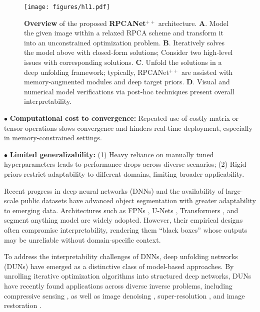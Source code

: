 \documentclass[10pt,journal,compsoc]{IEEEtran}
\begin{document}
\begin{figure*}[!t]
\setlength{\abovecaptionskip}{0.1cm}
\setlength{\belowcaptionskip}{0cm}
\centering
	\texttt{[image: figures/hl1.pdf]}
   \caption{\textbf{Overview} of the proposed \textbf{RPCANet$^{++}$} architecture. \textbf{A}. Model the given image within a relaxed RPCA scheme and transform it into an unconstrained optimization problem. \textbf{B}. Iteratively solves the model above with closed-form solutions; Consider two high-level issues with corresponding solutions. \textbf{C}. Unfold the solutions in a deep unfolding framework; typically, RPCANet$^{++}$ are assisted with memory-augmented modules and deep target priors. \textbf{D}. Visual and numerical model verifications via post-hoc techniques present overall interpretability.}
\label{fig:short}
\vspace{-0.3cm}
\end{figure*}



$\bullet$ \textbf{Computational cost to convergence:} Repeated use of costly matrix or tensor operations slows convergence and hinders real-time deployment, especially in memory-constrained settings.

$\bullet$ \textbf{Limited generalizability:} 
(1) Heavy reliance on manually tuned hyperparameters leads to performance drops across diverse scenarios;  
(2) Rigid priors restrict adaptability to different domains, limiting broader applicability.


Recent progress in deep neural networks (DNNs) and the availability of large-scale public datasets have advanced object segmentation with greater adaptability to emerging data. Architectures such as FPNs \cite{lin-2017-fpn}, U-Nets \cite{ronneberger-2015-unet}, Transformers \cite{vaswani-2017-transformer}, and segment anything model \cite{kirillov2023sam} are widely adopted. However, their empirical designs often compromise interpretability, rendering them “black boxes” whose outputs may be unreliable without domain-specific context.

To address the interpretability challenges of DNNs, deep unfolding networks (DUNs) have emerged as a distinctive class of model-based approaches. By unrolling iterative optimization algorithms into structured deep networks, DUNs have recently found applications across diverse inverse problems, including compressive sensing \cite{sun-2016-admmnet,shen2025hunet}, as well as image denoising \cite{ren-2021-denoise,zheng2021deep}, super-resolution \cite{zhang-2020-dunsuper,zhou2023memory}, and image restoration \cite{kong-2022-restoration, fu-2024-restoration}.
\end{document}
